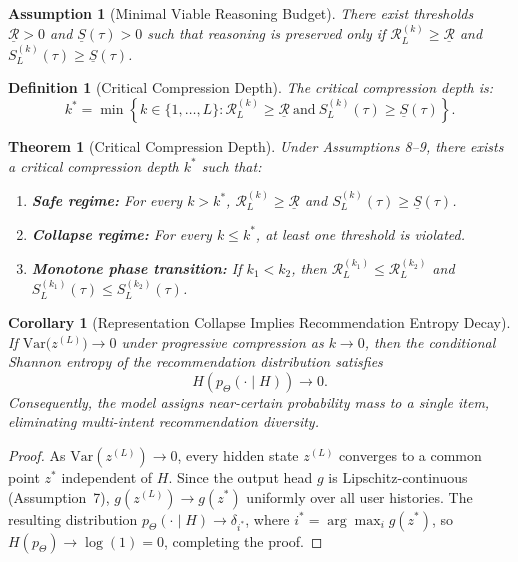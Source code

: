 \documentclass[lettersize,journal]{IEEEtran}
\newtheorem{theorem}{Theorem}
\newtheorem{definition}{Definition}
\newtheorem{assumption}{Assumption}
\newtheorem{corollary}{Corollary}
\begin{document}
\begin{assumption}[Minimal Viable Reasoning Budget]
There exist thresholds $\underline{\mathcal{R}} > 0$ and $\underline{S}(\tau) > 0$ such that reasoning is preserved only if $\mathcal{R}^{(k)}_L \ge \underline{\mathcal{R}}$ and $S^{(k)}_L(\tau) \ge \underline{S}(\tau)$.
\end{assumption}

\begin{definition}[Critical Compression Depth]
The critical compression depth is:
\begin{equation}
k^*
=
\min
\left\{
k \in \{1,\dots,L\} :
\mathcal{R}^{(k)}_L \ge \underline{\mathcal{R}}
\ \text{and}\
S^{(k)}_L(\tau)\ge \underline{S}(\tau)
\right\}.
\end{equation}
\end{definition}

\begin{theorem}[Critical Compression Depth]
Under Assumptions 8--9, there exists a critical compression depth $k^*$ such that:
\begin{enumerate}
    \item[(i)] \textbf{Safe regime:} For every $k > k^*$, $\mathcal{R}^{(k)}_L \ge \underline{\mathcal{R}}$ and $S^{(k)}_L(\tau)\ge \underline{S}(\tau)$.
    \item[(ii)] \textbf{Collapse regime:} For every $k \le k^*$, at least one threshold is violated.
    \item[(iii)] \textbf{Monotone phase transition:} If $k_1<k_2$, then $\mathcal{R}^{(k_1)}_L \le \mathcal{R}^{(k_2)}_L$ and $S^{(k_1)}_L(\tau) \le S^{(k_2)}_L(\tau)$.
\end{enumerate}
\end{theorem}

\begin{corollary}[Representation Collapse Implies Recommendation Entropy Decay]
\label{cor:entropy}
If $\mathrm{Var}\bigl(z^{(L)}\bigr) \to 0$ under progressive compression as $k \to 0$, then the conditional Shannon entropy of the recommendation distribution satisfies
\[
H\!\left(p_{\Theta}(\cdot \mid H)\right) \to 0.
\]
Consequently, the model assigns near-certain probability mass to a single item, eliminating multi-intent recommendation diversity.
\end{corollary}
\begin{proof}
As $\mathrm{Var}(z^{(L)}) \to 0$, every hidden state $z^{(L)}$ converges to a common point $z^*$ independent of $H$. Since the output head $g$ is Lipschitz-continuous (Assumption~7), $g(z^{(L)}) \to g(z^*)$ uniformly over all user histories. The resulting distribution $p_{\Theta}(\cdot \mid H) \to \delta_{i^*}$, where $i^* = \arg\max_i g(z^*)$, so $H(p_{\Theta}) \to \log(1) = 0$, completing the proof.
\end{proof}
\end{document}
